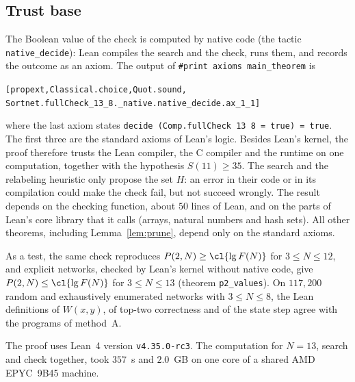 \subsection{Trust base}
The Boolean value of the check is computed by native code (the tactic \texttt{native\_decide}): Lean compiles
the search and the check, runs them, and records the outcome as an axiom. The output of
\texttt{\#print axioms main\_theorem} is
\begin{alltt}\small
[propext, Classical.choice, Quot.sound,
 Sortnet.fullCheck_13_8._native.native_decide.ax_1_1]
\end{alltt}
where the last axiom states \texttt{decide (Comp.fullCheck 13 8 = true) = true}. The first three are the
standard axioms of Lean's logic. Besides Lean's kernel, the proof therefore trusts the Lean compiler, the C
compiler and the runtime on one computation, together with the hypothesis $S(11)\ge35$. The search and the
relabeling heuristic only propose the set $H$: an error in their code or in its compilation could make the check
fail, but not succeed wrongly. The result depends on the checking function, about $50$ lines of Lean, and on
the parts of Lean's core library that it calls (arrays, natural numbers and hash sets). All other theorems,
including Lemma~\ref{lem:prune}, depend only on the standard axioms.

As a test, the same check reproduces $P(2,N)\ge\cl{\lg F(N)}$ for $3\le N\le12$, and explicit networks,
checked by Lean's kernel without native code, give $P(2,N)\le\cl{\lg F(N)}$ for $3\le N\le13$ (theorem
\texttt{p2\_values}). On $117{,}200$ random and exhaustively enumerated networks with $3\le N\le8$, the Lean
definitions of $W(x,y)$, of top-two correctness and of the state step agree with the programs of method~A.

The proof uses Lean~4 version \texttt{v4.35.0-rc3}. The computation for $N=13$, search and check together,
took $357$~s and $2.0$~GB on one core of a shared AMD EPYC~9B45 machine.
